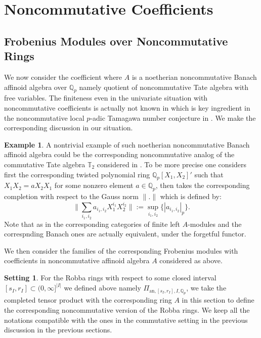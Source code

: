 \documentclass[12pt]{amsart}
\theoremstyle{definition}
\numberwithin{equation}{section}
\newtheorem{example}[theorem]{Example}
\newtheorem{setting}[theorem]{Setting}
\begin{document}
\newpage



\section{Noncommutative Coefficients}

\subsection{Frobenius Modules over Noncommutative Rings} \label{section5.1}

\noindent We now consider the coefficient where $A$ is a noetherian noncommutative Banach affinoid algebra over $\mathbb{Q}_p$ namely quotient of noncommutative Tate algebra with free variables. The finiteness even in the univariate situation with noncommutative coefficients is actually not known in \cite{Zah1} which is key ingredient in the noncommutative local $p$-adic Tamagawa number conjecture in \cite{Zah1}. We make the corresponding discussion in our situation.




\begin{example} \label{example5.1}
A nontrivial example of such noetherian noncommutative Banach affinoid algebra could be the corresponding noncommutative analog of the commutative Tate algebra $\mathbb{T}_2$ considered in \cite[Section 3]{So1}. To be more precise one considers first the corresponding twisted polynomial ring $\mathbb{Q}_p[X_1,X_2]'$ such that $X_1X_2=aX_2X_1$ for some nonzero element $a\in \mathbb{Q}_p$, then takes the corresponding completion with respect to the Gauss norm $\|.\|$ which is defined by:
\begin{displaymath}
\|\sum_{i_1,i_2}a_{i_1,i_2}X_1^{i_1}X_2^{i_2}\|:=\sup_{i_1,i_2} \{|a_{i_1,i_2}|_p\}.	
\end{displaymath}
Note that as in \cite[Proposition 3.1]{So1} the corresponding categories of finite left $A$-modules and the correspnding Banach ones are actually equivalent, under the forgetful functor. 	
\end{example}



\indent We then consider the families of the corresponding Frobenius modules with coefficients in noncommutative affinoid algebra $A$ considered as above. 


\begin{setting}
For the Robba rings with respect to some closed interval $[s_I,r_I]\subset (0,\infty]^{|I|}$ we defined above namely $\Pi_{\mathrm{an},[s_I,r_I],I,\mathbb{Q}_p}$, we take the completed tensor product with the corresponding ring $A$ in this section to define the corresponding noncommutative version of the Robba rings. We keep all the notations compatible with the ones in the commutative setting in the previous discussion in the previous sections.	
\end{setting}
\end{document}
